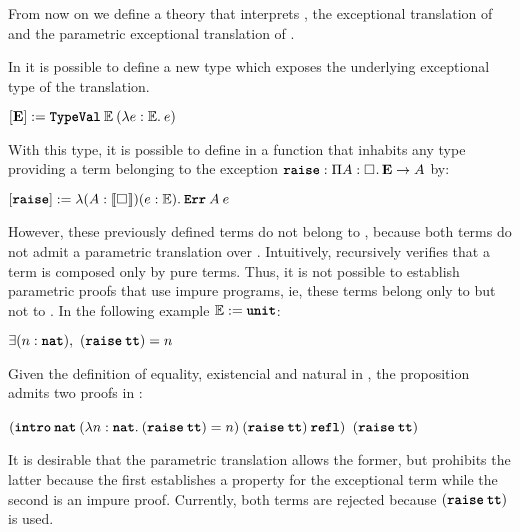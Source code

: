 
From now on we define \Theory{} a theory that interprets \CIC{}, \ETheory{} the exceptional translation of 
\Theory{} and \PTheory{} the parametric exceptional translation of \Theory{}.

In \ETheory{} it is possible to define a new type \BExceptionType{} which exposes the underlying 
exceptional type \ExceptionType{} of the translation.
\begin{center} 
$\Trans{\BExceptionType}\termDef \app{\TypeVal}{\ExceptionType}{(\abs{e}{\ExceptionType}{e})}$ 
\end{center}
With this type, it is possible to define in \ETheory{} a function that inhabits any type providing a term
belonging to the 
exception $\typing{\raiseFun{}}{\depArrow{A}{\Type[]{}}{\arrow{\BExceptionType}{A}}}$ by:
\begin{center}
$\Trans{\raiseFun}\termDef \abs{A}{\TypeTrans{\Type[]{}}}{e}{\ExceptionType}{\app{\Err}{A}{e}}$ 
\end{center}
However, these previously defined terms do not belong to \PTheory, because both terms do not admit a 
parametric translation over \ParamTrans{\cdot}. Intuitively, \ParamTrans{\cdot} recursively verifies that 
a term is composed only by pure terms. Thus, it is not possible to establish parametric proofs that use 
impure programs, ie, these terms belong only to \ETheory{} but not to \PTheory. In the following 
example $\mathbb{E}:=\texttt{\textbf{unit}}$:
\begin{center}
$\exists (n:\mathtexttt{nat}),\ (\app{\raiseFun}{\ttUnit}) = n $
\end{center}
Given the definition of equality, existencial and natural in , the proposition admits two
proofs in \ETheory{}:
\begin{center}
$(\app{\mathtexttt{intro}}{\mathtexttt{nat}}{(\abs{n}{\mathtexttt{nat}}{(\app{\raiseFun}{\ttUnit}) = n})}{
      (\app{\raiseFun}{\ttUnit})}{\eqRefl})$
\hspace{2em} 
$(\app{\raiseFun}{\ttUnit})$
\end{center}
It is desirable that the parametric translation allows the former, but prohibits the latter because 
the first establishes a property for the exceptional term while the second is an impure proof. Currently,
both terms are rejected because $(\app{\raiseFun}{\ttUnit})$ is used. 

